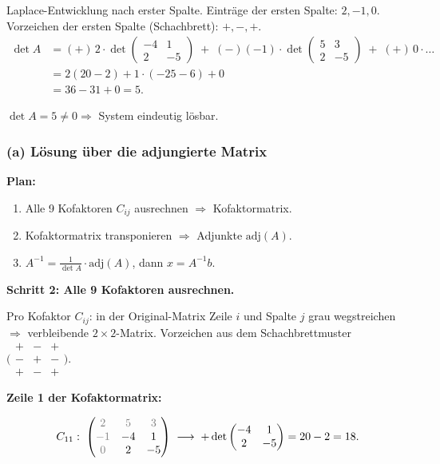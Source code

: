 \documentclass[a4paper,12pt]{article}
\begin{document}
Laplace-Entwicklung nach erster Spalte. Eintr\"age der ersten Spalte: $2, -1, 0$. Vorzeichen der ersten Spalte (Schachbrett): $+, -, +$.
\begin{align*}
\det A &= (+)\,2 \cdot \det \begin{pmatrix} -4 & 1 \\ 2 & -5 \end{pmatrix} \;+\; (-)(-1) \cdot \det \begin{pmatrix} 5 & 3 \\ 2 & -5 \end{pmatrix} \;+\; (+)\,0 \cdot \dots \\
&= 2(20 - 2) + 1 \cdot (-25 - 6) + 0 \\
&= 36 - 31 + 0 = 5.
\end{align*}

$\det A = 5 \neq 0 \Rightarrow$ System eindeutig l\"osbar.

\subsubsection*{(a) L\"osung \"uber die adjungierte Matrix}

\textbf{Plan:}
\begin{enumerate}[leftmargin=*, nosep]
    \item Alle 9 Kofaktoren $C_{ij}$ ausrechnen $\Rightarrow$ Kofaktormatrix.
    \item Kofaktormatrix transponieren $\Rightarrow$ Adjunkte $\text{adj}(A)$.
    \item $A^{-1} = \tfrac{1}{\det A} \cdot \text{adj}(A)$, dann $x = A^{-1} b$.
\end{enumerate}

\textbf{Schritt 2: Alle 9 Kofaktoren ausrechnen.}

Pro Kofaktor $C_{ij}$: in der Original-Matrix Zeile $i$ und Spalte $j$ grau wegstreichen $\Rightarrow$ verbleibende $2\times 2$-Matrix. Vorzeichen aus dem Schachbrettmuster $\bigl(\begin{smallmatrix} + & - & + \\ - & + & - \\ + & - & + \end{smallmatrix}\bigr)$.

\textbf{Zeile 1 der Kofaktormatrix:}

\[
C_{11}: \;
\begin{pmatrix}
\color{gray}2 & \color{gray}5 & \color{gray}3 \\
\color{gray}{-1} & -4 & 1 \\
\color{gray}0 & 2 & -5
\end{pmatrix}
\;\longrightarrow\;
+\det \begin{pmatrix} -4 & 1 \\ 2 & -5 \end{pmatrix} = 20 - 2 = 18.
\]
\end{document}
